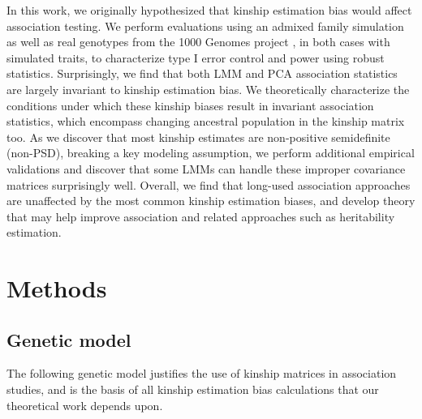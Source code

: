 \documentclass[11pt]{article}
\begin{document}
\begin{linenumbers}
In this work, we originally hypothesized that kinship estimation bias would affect association testing.
We perform evaluations using an admixed family simulation \citep{yao_limitations_2022} as well as real genotypes from the 1000 Genomes project \citep{the_1000_genomes_project_consortium_map_2010, 1000_genomes_project_consortium_integrated_2012, fairley_international_2020}, in both cases with simulated traits, to characterize type I error control and power using robust statistics.
Surprisingly, we find that both LMM and PCA association statistics are largely invariant to kinship estimation bias.
We theoretically characterize the conditions under which these kinship biases result in invariant association statistics, which encompass changing ancestral population in the kinship matrix too.
As we discover that most kinship estimates are non-positive semidefinite (non-PSD), breaking a key modeling assumption, we perform additional empirical validations and discover that some LMMs can handle these improper covariance matrices surprisingly well.
Overall, we find that long-used association approaches are unaffected by the most common kinship estimation biases, and develop theory that may help improve association and related approaches such as heritability estimation.


\section{Methods}

\subsection{Genetic model}

The following genetic model justifies the use of kinship matrices in association studies, and is the basis of all kinship estimation bias calculations that our theoretical work depends upon.


\end{linenumbers}
\end{document}
